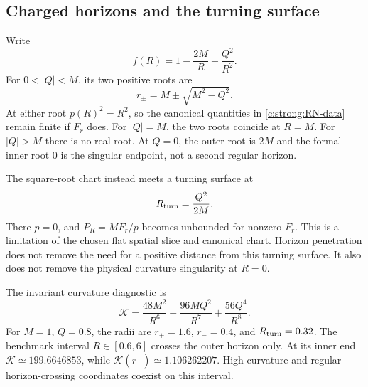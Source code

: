 \subsection{Charged horizons and the turning surface}
Write
\begin{equation}
 f(R)=1-\frac{2M}R+\frac{Q^2}{R^2}.
\end{equation}
For $0<|Q|<M$, its two positive roots are
\begin{equation}
 r_\pm=M\pm\sqrt{M^2-Q^2}.
\end{equation}
At either root $p(R)^2=R^2$, so the canonical quantities in \eqref{c:strong:RN-data} remain finite if $F_r$ does. For $|Q|=M$, the two roots coincide at $R=M$. For $|Q|>M$ there is no real root. At $Q=0$, the outer root is $2M$ and the formal inner root $0$ is the singular endpoint, not a second regular horizon.

The square-root chart instead meets a turning surface at
\begin{equation}
 R_{\rm turn}=\frac{Q^2}{2M}.
\end{equation}
There $p=0$, and $P_R=MF_r/p$ becomes unbounded for nonzero $F_r$. This is a limitation of the chosen flat spatial slice and canonical chart. Horizon penetration does not remove the need for a positive distance from this turning surface. It also does not remove the physical curvature singularity at $R=0$.

The invariant curvature diagnostic is
\begin{equation}
 \mathcal K=\frac{48M^2}{R^6}-\frac{96MQ^2}{R^7}
                            +\frac{56Q^4}{R^8}.
\end{equation}
For $M=1$, $Q=0.8$, the radii are $r_+=1.6$, $r_-=0.4$, and $R_{\rm turn}=0.32$. The benchmark interval $R\in[0.6,6]$ crosses the outer horizon only. At its inner end $\mathcal K\simeq199.6646853$, while $\mathcal K(r_+)\simeq1.106262207$. High curvature and regular horizon-crossing coordinates coexist on this interval.


